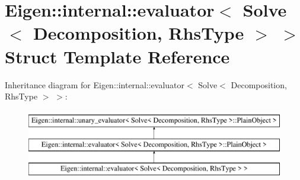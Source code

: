 \hypertarget{struct_eigen_1_1internal_1_1evaluator_3_01_solve_3_01_decomposition_00_01_rhs_type_01_4_01_4}{}\section{Eigen\+::internal\+::evaluator$<$ Solve$<$ Decomposition, Rhs\+Type $>$ $>$ Struct Template Reference}
\label{struct_eigen_1_1internal_1_1evaluator_3_01_solve_3_01_decomposition_00_01_rhs_type_01_4_01_4}
Inheritance diagram for Eigen\+::internal\+::evaluator$<$ Solve$<$ Decomposition, Rhs\+Type $>$ $>$\+:\begin{figure}[H]
\begin{center}
\leavevmode
\includegraphics[height=3.000000cm]{struct_eigen_1_1internal_1_1evaluator_3_01_solve_3_01_decomposition_00_01_rhs_type_01_4_01_4}
\end{center}
\end{figure}
